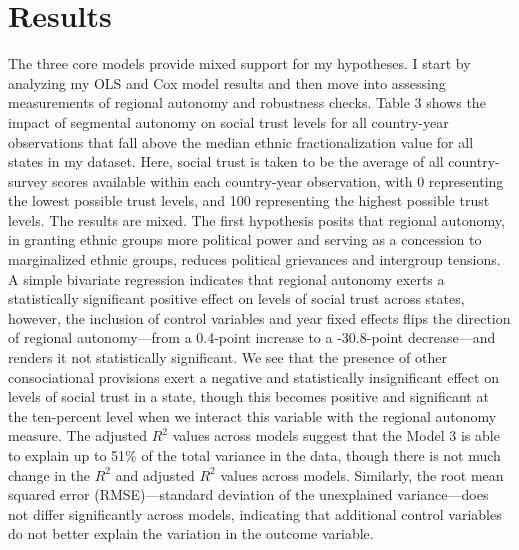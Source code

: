 \documentclass[12pt]{article}
\begin{document}
\section{Results}
The three core models provide mixed support for my hypotheses. I start by analyzing my OLS and Cox model results and then move into assessing measurements of regional autonomy and robustness checks. Table 3 shows the impact of segmental autonomy on social trust levels for all country-year observations that fall above the median ethnic fractionalization value for all states in my dataset. Here, social trust is taken to be the average of all country-survey scores available within each country-year observation, with 0 representing the lowest possible trust levels, and 100 representing the highest possible trust levels. The results are mixed. The first hypothesis posits that regional autonomy, in granting ethnic groups more political power and serving as a concession to marginalized ethnic groups, reduces political grievances and intergroup tensions. A simple bivariate regression indicates that regional autonomy exerts a statistically significant positive effect on levels of social trust across states, however, the inclusion of control variables and year fixed effects flips the direction of regional autonomy---from a 0.4-point increase to a -30.8-point decrease---and renders it not statistically significant. We see that the presence of other consociational provisions exert a negative and statistically insignificant effect on levels of social trust in a state, though this becomes positive and significant at the ten-percent level when we interact this variable with the regional autonomy measure. The adjusted $R^2$ values across models suggest that the Model 3 is able to explain up to 51\% of the total variance in the data, though there is not much change in the $R^2$ and adjusted $R^2$ values across models. Similarly, the root mean squared error (RMSE)---standard deviation of the unexplained variance---does not differ significantly across models, indicating that additional control variables do not better explain the variation in the outcome variable.  
\end{document}
